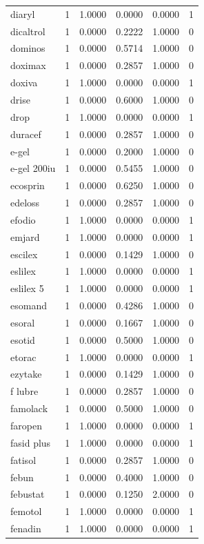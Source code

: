 \begin{longtable}{p{3.0cm}rrrrr}
diaryl & 1 & 1.0000 & 0.0000 & 0.0000 & 1 \\
dicaltrol & 1 & 0.0000 & 0.2222 & 1.0000 & 0 \\
dominos & 1 & 0.0000 & 0.5714 & 1.0000 & 0 \\
doximax & 1 & 0.0000 & 0.2857 & 1.0000 & 0 \\
doxiva & 1 & 1.0000 & 0.0000 & 0.0000 & 1 \\
drise & 1 & 0.0000 & 0.6000 & 1.0000 & 0 \\
drop & 1 & 1.0000 & 0.0000 & 0.0000 & 1 \\
duracef & 1 & 0.0000 & 0.2857 & 1.0000 & 0 \\
e-gel & 1 & 0.0000 & 0.2000 & 1.0000 & 0 \\
e-gel 200iu & 1 & 0.0000 & 0.5455 & 1.0000 & 0 \\
ecosprin & 1 & 0.0000 & 0.6250 & 1.0000 & 0 \\
edeloss & 1 & 0.0000 & 0.2857 & 1.0000 & 0 \\
efodio & 1 & 1.0000 & 0.0000 & 0.0000 & 1 \\
emjard & 1 & 1.0000 & 0.0000 & 0.0000 & 1 \\
escilex & 1 & 0.0000 & 0.1429 & 1.0000 & 0 \\
eslilex & 1 & 1.0000 & 0.0000 & 0.0000 & 1 \\
eslilex 5 & 1 & 1.0000 & 0.0000 & 0.0000 & 1 \\
esomand & 1 & 0.0000 & 0.4286 & 1.0000 & 0 \\
esoral & 1 & 0.0000 & 0.1667 & 1.0000 & 0 \\
esotid & 1 & 0.0000 & 0.5000 & 1.0000 & 0 \\
etorac & 1 & 1.0000 & 0.0000 & 0.0000 & 1 \\
ezytake & 1 & 0.0000 & 0.1429 & 1.0000 & 0 \\
f lubre & 1 & 0.0000 & 0.2857 & 1.0000 & 0 \\
famolack & 1 & 0.0000 & 0.5000 & 1.0000 & 0 \\
faropen & 1 & 1.0000 & 0.0000 & 0.0000 & 1 \\
fasid plus & 1 & 1.0000 & 0.0000 & 0.0000 & 1 \\
fatisol & 1 & 0.0000 & 0.2857 & 1.0000 & 0 \\
febun & 1 & 0.0000 & 0.4000 & 1.0000 & 0 \\
febustat & 1 & 0.0000 & 0.1250 & 2.0000 & 0 \\
femotol & 1 & 1.0000 & 0.0000 & 0.0000 & 1 \\
fenadin & 1 & 1.0000 & 0.0000 & 0.0000 & 1 \\

\end{longtable}
